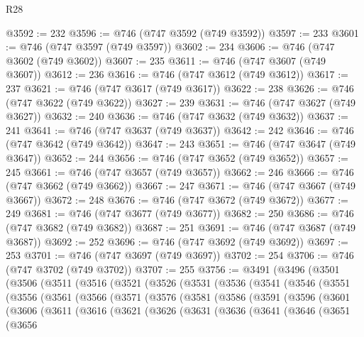 \begin{lexlean}{R28}
\begin{coremodule}
@3592 := 232
@3596 := @746 (@747 @3592 (@749 @3592))
@3597 := 233
@3601 := @746 (@747 @3597 (@749 @3597))
@3602 := 234
@3606 := @746 (@747 @3602 (@749 @3602))
@3607 := 235
@3611 := @746 (@747 @3607 (@749 @3607))
@3612 := 236
@3616 := @746 (@747 @3612 (@749 @3612))
@3617 := 237
@3621 := @746 (@747 @3617 (@749 @3617))
@3622 := 238
@3626 := @746 (@747 @3622 (@749 @3622))
@3627 := 239
@3631 := @746 (@747 @3627 (@749 @3627))
@3632 := 240
@3636 := @746 (@747 @3632 (@749 @3632))
@3637 := 241
@3641 := @746 (@747 @3637 (@749 @3637))
@3642 := 242
@3646 := @746 (@747 @3642 (@749 @3642))
@3647 := 243
@3651 := @746 (@747 @3647 (@749 @3647))
@3652 := 244
@3656 := @746 (@747 @3652 (@749 @3652))
@3657 := 245
@3661 := @746 (@747 @3657 (@749 @3657))
@3662 := 246
@3666 := @746 (@747 @3662 (@749 @3662))
@3667 := 247
@3671 := @746 (@747 @3667 (@749 @3667))
@3672 := 248
@3676 := @746 (@747 @3672 (@749 @3672))
@3677 := 249
@3681 := @746 (@747 @3677 (@749 @3677))
@3682 := 250
@3686 := @746 (@747 @3682 (@749 @3682))
@3687 := 251
@3691 := @746 (@747 @3687 (@749 @3687))
@3692 := 252
@3696 := @746 (@747 @3692 (@749 @3692))
@3697 := 253
@3701 := @746 (@747 @3697 (@749 @3697))
@3702 := 254
@3706 := @746 (@747 @3702 (@749 @3702))
@3707 := 255
@3756 := @3491
    (@3496
      (@3501
        (@3506
          (@3511
            (@3516
              (@3521
                (@3526
                  (@3531
                    (@3536
                      (@3541
                        (@3546
                          (@3551
                            (@3556
                              (@3561
                                (@3566
                                  (@3571
                                    (@3576
                                      (@3581
                                        (@3586
                                          (@3591
                                            (@3596
                                              (@3601
                                                (@3606
                                                  (@3611
                                                    (@3616
                                                      (@3621
                                                        (@3626
                                                          (@3631
                                                            (@3636
                                                              (@3641
                                                                (@3646
                                                                  (@3651
                                                                    (@3656

\end{coremodule}
\end{lexlean}
